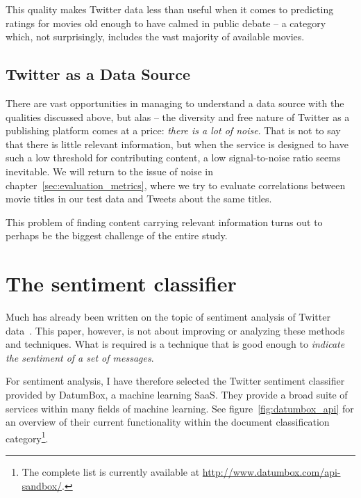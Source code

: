 This quality makes Twitter data less than useful when it comes to predicting ratings for movies old enough to have calmed in public debate -- a category which, not surprisingly, includes the vast majority of available movies.


\subsection{Twitter as a Data Source} %
\label{sub:twitter_as_a_data_source}

There are vast opportunities in managing to understand a data source with the qualities discussed above, but alas -- the diversity and free nature of Twitter as a publishing platform comes at a price: \emph{there is a lot of noise}.
That is not to say that there is little relevant information, but when the service is designed to have such a low threshold for contributing content, a low signal-to-noise ratio seems inevitable.
We will return to the issue of noise in chapter~\ref{sec:evaluation_metrics}, where we try to evaluate correlations between movie titles in our test data and Tweets about the same titles.

This problem of finding content carrying relevant information turns out to perhaps be the biggest challenge of the entire study.



\section{The sentiment classifier} %
\label{sec:the_sentiment_classifier}

Much has already been written on the topic of sentiment analysis of Twitter data~\cite{go2009twitter, go2009twitterdistant, pak2010twitter, agarwal2011sentiment, kouloumpis2011twitter}. This paper, however, is not about improving or analyzing these methods and techniques. What is required is a technique that is good enough to \emph{indicate the sentiment of a set of messages}.

For sentiment analysis, I have therefore selected the Twitter sentiment classifier provided by DatumBox, a machine learning SaaS. They provide a broad suite of services within many fields of machine learning. See figure~\ref{fig:datumbox_api} for an overview of their current functionality within the document classification category\footnote{The complete list is currently available at \url{http://www.datumbox.com/api-sandbox/}.}.


